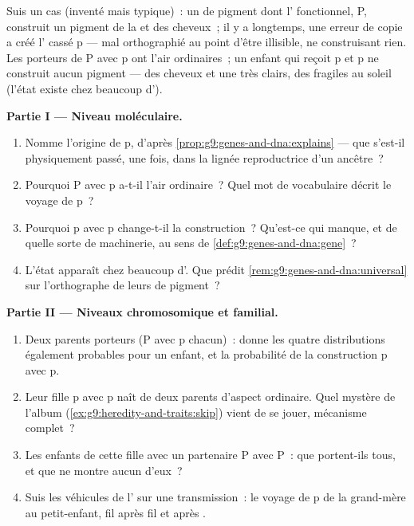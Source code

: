 \begin{problem}\label{pb:g9:genes-and-dna:1}
Suis un cas (inventé mais typique)~: un  de pigment
dont l' fonctionnel, P, construit un pigment de la
 et des cheveux~; il y a longtemps, une erreur de copie
a créé l' cassé p --- mal orthographié au point
d'être illisible, ne construisant rien. Les porteurs de P
avec p ont l'air ordinaires~; un enfant qui reçoit p et p
ne construit aucun pigment --- des cheveux et une  très
clairs, des  fragiles au soleil (l'état existe chez
beaucoup d').

\medskip\noindent\textbf{Partie I --- Niveau moléculaire.}
\begin{enumerate}
  \item Nomme l'origine de p, d'après
        \cref{prop:g9:genes-and-dna:explains} --- que
        s'est-il physiquement passé, une fois, dans la
        lignée reproductrice d'un ancêtre~?
  \item Pourquoi P avec p a-t-il l'air ordinaire~? Quel mot
        de vocabulaire décrit le voyage de p~?
  \item Pourquoi p avec p change-t-il la construction~?
        Qu'est-ce qui manque, et de quelle sorte de
        machinerie, au sens de
        \cref{def:g9:genes-and-dna:gene}~?
  \item L'état apparaît chez beaucoup d'. Que
        prédit \cref{rem:g9:genes-and-dna:universal} sur
        l'orthographe de leurs  de pigment~?
\end{enumerate}

\medskip\noindent\textbf{Partie II --- Niveaux
chromosomique et familial.}
\begin{enumerate}[resume]
  \item Deux parents porteurs (P avec p chacun)~: donne les
        quatre distributions également probables pour un
        enfant, et la probabilité de la construction p avec
        p.
  \item Leur fille p avec p naît de deux parents d'aspect
        ordinaire. Quel mystère de l'album
        (\cref{ex:g9:heredity-and-traits:skip}) vient de se
        jouer, mécanisme complet~?
  \item Les enfants de cette fille avec un partenaire P
        avec P~: que portent-ils tous, et que ne montre
        aucun d'eux~?
  \item Suis les véhicules de l' sur une
        transmission~: le voyage de p de la grand-mère au
        petit-enfant, fil après fil et  après .
\end{enumerate}


\end{problem}
